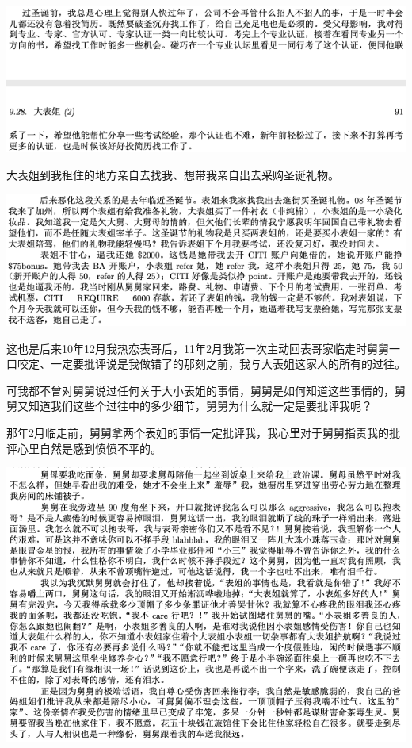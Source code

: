 \documentclass[9pt, b5paper]{article}
\begin{document}
\begin{center}
\includegraphics[width=.9\linewidth]{./pic/p1p91.png}
\end{center}

大表姐到我租住的地方亲自去找我、想带我亲自出去采购圣诞礼物。

\begin{center}
\includegraphics[width=.9\linewidth]{./pic/p1p48-2.png}
\end{center}

这也是后来10年12月我热恋表哥后，11年2月我第一次主动回表哥家临走时舅舅一口咬定、一定要批评说是我做错了的那刻之前，我与大表姐这家人的所有的过往。

可我都不曾对舅舅说过任何关于大小表姐的事情，舅舅是如何知道这些事情的，舅舅又知道我们这些个过往中的多少细节，舅舅为什么就一定是要批评我呢？

那年2月临走前，舅舅拿两个表姐的事情一定批评我，我心里对于舅舅指责我的批评心里自然是感到愤愤不平的。 

\begin{center}
\includegraphics[width=.9\linewidth]{./pic/p1p51.png}
\end{center}  
\end{document}
